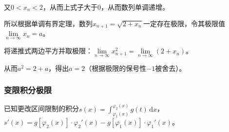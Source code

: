 \documentclass[UTF8, 12pt]{ctexart}
\begin{document}
又$0<x_n<2$，从而上式子大于0，从而数列单调递增。

所以根据单调有界定理，数列$x_{n+1}=\sqrt{2+x_n}$一定存在极限，令其极限值$\lim\limits_{n\to\infty}x_n=a$。

将递推式两边平方并取极限：$\lim\limits_{n\to\infty}x^2_{n+1}=\lim\limits_{n\to\infty}(2+x_n)$。

从而$a^2=2+a$，得出$a=2$（根据极限的保号性$-1$被舍去）。

\subsubsection{变限积分极限}

已知更改区间限制的积分$s(x)=\int_{\varphi_1(x)}^{\varphi_2(x)}g(t)\,\textrm{d}x$，$s'(x)=g[\varphi_2(x)]\cdot\varphi_2'(x)-g[\varphi_1(x)]\cdot\varphi_1'(x)$。
\end{document}
